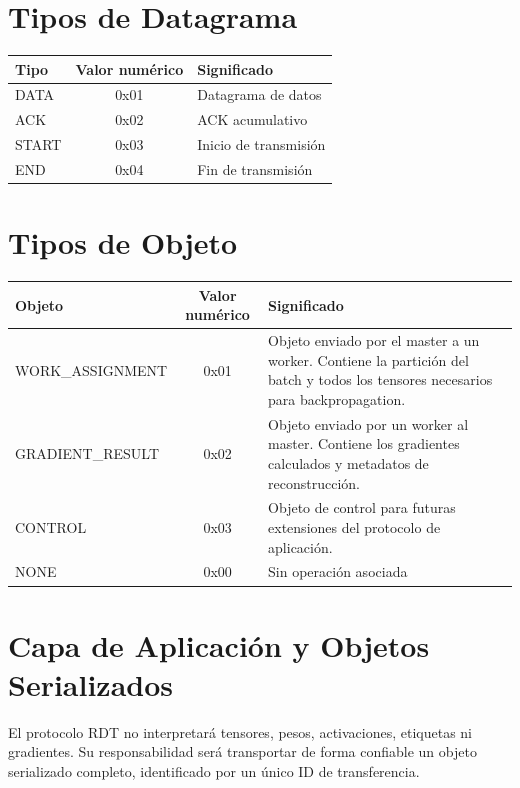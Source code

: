 \documentclass[12pt]{article}
\begin{document}
\section{Tipos de Datagrama}

\begin{table}[h]
\centering
\begin{tabular}{|l|c|p{8cm}|}
\hline
Tipo & Valor numérico & Significado \\
\hline
DATA & 0x01 & Datagrama de datos \\
\hline
ACK & 0x02 & ACK acumulativo \\
\hline
START & 0x03 & Inicio de transmisión \\
\hline
END & 0x04 & Fin de transmisión \\
\hline
\end{tabular}
\end{table}

\section{Tipos de Objeto}

\begin{table}[h]
\centering
\begin{tabular}{|p{4.8cm}|c|p{6.7cm}|}
\hline
Objeto & Valor numérico & Significado \\
\hline
WORK\_ASSIGNMENT & 0x01 & Objeto enviado por el master a un worker. Contiene la partición del batch y todos los tensores necesarios para backpropagation. \\
\hline
GRADIENT\_RESULT & 0x02 & Objeto enviado por un worker al master. Contiene los gradientes calculados y metadatos de reconstrucción. \\
\hline
CONTROL & 0x03 & Objeto de control para futuras extensiones del protocolo de aplicación. \\
\hline
NONE & 0x00 & Sin operación asociada \\
\hline
\end{tabular}
\end{table}

\section{Capa de Aplicación y Objetos Serializados}

El protocolo RDT no interpretará tensores, pesos, activaciones, etiquetas ni gradientes. Su responsabilidad será transportar de forma confiable un objeto serializado completo, identificado por un único ID de transferencia.
\end{document}
